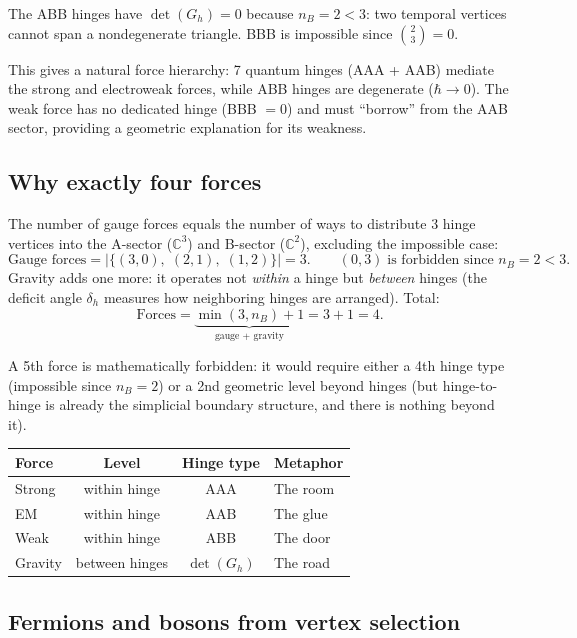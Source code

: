 \documentclass[12pt]{article}
\theoremstyle{remark}
\theoremstyle{definition}
\begin{document}
The ABB hinges have $\det(G_h) = 0$ because $n_B = 2 < 3$: two temporal vertices cannot span a nondegenerate triangle. BBB is impossible since $\binom{2}{3} = 0$.

This gives a natural force hierarchy: 7 quantum hinges (AAA + AAB) mediate the strong and electroweak forces, while ABB hinges are degenerate ($\hbar \to 0$). The weak force has no dedicated hinge (BBB $= 0$) and must ``borrow'' from the AAB sector, providing a geometric explanation for its weakness.

\subsection{Why exactly four forces}

The number of gauge forces equals the number of ways to distribute 3 hinge vertices into the A-sector ($\mathbb{C}^3$) and B-sector ($\mathbb{C}^2$), excluding the impossible case:
\begin{equation}
\text{Gauge forces} = |\{(3,0),\;(2,1),\;(1,2)\}| = 3. \qquad (0,3)\;\text{is forbidden since } n_B = 2 < 3.
\end{equation}
Gravity adds one more: it operates not \emph{within} a hinge but \emph{between} hinges (the deficit angle $\delta_h$ measures how neighboring hinges are arranged). Total:
\begin{equation}
\text{Forces} = \underbrace{\min(3, n_B) + 1}_{\text{gauge + gravity}} = 3 + 1 = 4.
\end{equation}

A 5th force is mathematically forbidden: it would require either a 4th hinge type (impossible since $n_B = 2$) or a 2nd geometric level beyond hinges (but hinge-to-hinge is already the simplicial boundary structure, and there is nothing beyond it).

\begin{center}
\begin{tabular}{lccl}
\hline
Force & Level & Hinge type & Metaphor \\
\hline
Strong & within hinge & AAA & The room \\
EM & within hinge & AAB & The glue \\
Weak & within hinge & ABB & The door \\
Gravity & between hinges & $\det(G_h)$ & The road \\
\hline
\end{tabular}
\end{center}

\subsection{Fermions and bosons from vertex selection}
\label{sec:spin_statistics}
\end{document}
